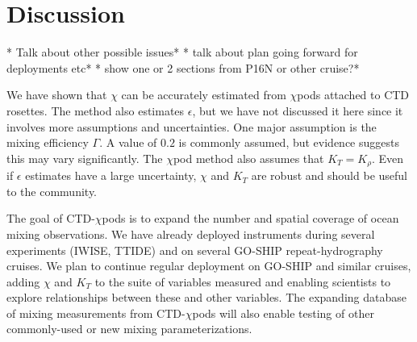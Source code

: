 \documentclass{ametsoc}
\begin{document}
%
%
%
%



\section{Discussion}

* Talk about other possible issues*
* talk about plan going forward for deployments etc*
* show one or 2 sections from P16N or other cruise?*

We have shown that $\chi$ can be accurately estimated from $\chi$pods attached to CTD rosettes. The method also estimates $\epsilon$, but we have not discussed it here since it involves more assumptions and uncertainties. One major assumption is the mixing efficiency $\Gamma$. A value of $0.2$ is commonly assumed, but evidence suggests this may vary significantly. The $\chi$pod method also assumes that $K_T=K_{\rho}$. Even if $\epsilon$ estimates have a large uncertainty, $\chi$ and $K_T$ are robust and should be useful to the community.

The goal of CTD-$\chi$pods is to expand the number and spatial coverage of ocean mixing observations. We have already deployed instruments during several experiments (IWISE, TTIDE) and on several GO-SHIP repeat-hydrography cruises. We plan to continue regular deployment on GO-SHIP and similar cruises, adding $\chi$ and $K_T$ to the suite of variables measured and enabling scientists to explore relationships between these and other variables. The expanding database of mixing measurements from CTD-$\chi$pods will also enable testing of other commonly-used or new mixing parameterizations. 
\end{document}
